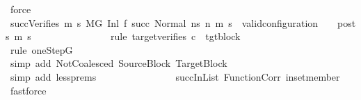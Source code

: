 \begin{isabellebody}
\ force\isanewline
\ \ \ \ \ \ \ \ \ \ \ \ \isamarkupfalse%
\ succVerifies{\isacharcolon}{\kern0pt}\ {\isachardoublequoteopen}{\isasymforall}m{}{\isacharprime}{\kern0pt}\ s{}{\isacharprime}{\kern0pt}{\isachardot}{\kern0pt}\ {\isacharparenleft}{\kern0pt}M{\isacharcomma}{\kern0pt}{\isasymLambda}{\isacharcomma}{\kern0pt}{\isasymGamma}{\isacharcomma}{\kern0pt}{\isasymOmega}{\isacharcomma}{\kern0pt}G{\isacharprime}{\kern0pt}\ {\isasymturnstile}{\isacharparenleft}{\kern0pt}Inl\ {\isacharparenleft}{\kern0pt}f\ succ{\isacharparenright}{\kern0pt}{\isacharcomma}{\kern0pt}\ Normal\ ns{\isacharprime}{\kern0pt}{\isacharparenright}{\kern0pt}\ {\isacharminus}{\kern0pt}n{\isasymrightarrow}{\isacharasterisk}{\kern0pt}\ {\isacharparenleft}{\kern0pt}m{}{\isacharprime}{\kern0pt}{\isacharcomma}{\kern0pt}\ s{}{\isacharprime}{\kern0pt}{\isacharparenright}{\kern0pt}{\isacharparenright}{\kern0pt}\ {\isasymlongrightarrow}\ valid{\isacharunderscore}{\kern0pt}configuration\ {\isasymLambda}\ {\isasymGamma}\ {\isasymOmega}\ posts\ m{}{\isacharprime}{\kern0pt}\ s{}{\isacharprime}{\kern0pt}{\isachardoublequoteclose}\isanewline
\ \ \ \ \ \ \ \ \ \ \ \ \ \ \isamarkupfalse%
\ {\isacharparenleft}{\kern0pt}rule\ target{\isacharunderscore}{\kern0pt}verifies{\isacharbrackleft}{\kern0pt}\ {\isacharquery}{\kern0pt}c\ {\isacharequal}{\kern0pt}\ tgt{\isacharunderscore}{\kern0pt}block{\isacharbrackright}{\kern0pt}{\isacharparenright}{\kern0pt}\isanewline
\ \ \ \ \ \ \ \ \ \ \ \ \ \ \isamarkupfalse%
\ {\isacharparenleft}{\kern0pt}rule\ oneStepG{\isacharparenright}{\kern0pt}\isanewline
\ \ \ \ \ \ \ \ \ \ \ \ \ \ \isamarkupfalse%
\ {\isacharparenleft}{\kern0pt}simp\ add{\isacharcolon}{\kern0pt}\ NotCoalesced\ SourceBlock\ TargetBlock{\isacharparenright}{\kern0pt}\isanewline
\ \ \ \ \ \ \ \ \ \ \ \ \ \ \isamarkupfalse%
\ {\isacharparenleft}{\kern0pt}simp\ add{\isacharcolon}{\kern0pt}\ less{\isachardot}{\kern0pt}prems{\isacharparenleft}{\kern0pt}{}{\isacharparenright}{\kern0pt}{\isacharparenright}{\kern0pt}\isanewline
\ \ \ \ \ \ \ \ \ \ \ \ \ \ \isamarkupfalse%
\ succInList\ FunctionCorr\ in{\isacharunderscore}{\kern0pt}set{\isacharunderscore}{\kern0pt}member\ \isamarkupfalse%
\ fastforce\isanewline
\ \ \ \ \ \ \ \ \ \ \ \ \isamarkupfalse%

\end{isabellebody}
